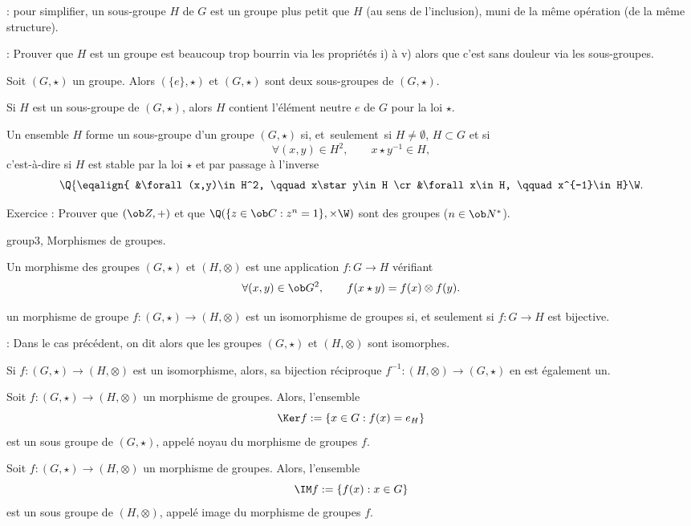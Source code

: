 \Remarque : pour simplifier, un sous-groupe $H$ de $G$ est un groupe plus petit que $H$ (au sens de l'inclusion), muni de la m\^eme op\'eration (de la m\^eme structure). 
\bigskip

\Remarque : Prouver que $H$ est un groupe est beaucoup trop bourrin via les propri\'et\'es i) \`a v) alors que 
c'est sans douleur via les sous-groupes. 
\bigskip

\Propriete []  Soit $(G,\star)$ un groupe. Alors $(\{e\},\star)$ et $(G,\star)$ sont deux sous-groupes de $(G,\star)$. 
\bigskip

\Propriete []  Si $H$ est un sous-groupe de $(G,\star)$, alors $H$ contient l'\'el\'ement neutre $e$ de $G$ pour la loi $\star$. 
\bigskip

\Propriete []  Un ensemble $H$ forme un sous-groupe d'un groupe $(G,\star)$ si, et~seulement~si
$H\neq\emptyset$, $H\subset G$ et si 
$$
{\forall (x,y)\in H^2,\qquad x\star y^{-1}\in H}, 
$$
c'est-\`a-dire si $H$ est stable par la loi $\star$ et par passage \`a l'inverse
$$
\Q\{
\eqalign{
&\forall (x,y)\in H^2, \qquad x\star y\in H
\cr
&\forall x\in H, \qquad x^{-1}\in H}\W.
$$

Exercice :  Prouver que $(\ob Z, +)$ et que $\Q(\{z\in\ob C:z^n=1\},\times\W)$ sont des groupes ($n\in\ob N^*$). 
\bigskip

\Subsection group3, Morphismes de groupes. 

Un morphisme des groupes $(G,\star)$ et $(H,\otimes)$ est une application $f:G\to H$ v\'erifiant 
$$
\forall (x,y)\in\ob G^2 , \qquad  f(x\star y)=f(x)\otimes f(y) .
$$ 

\Definition []  un morphisme de groupe $f:(G,\star)\to(H,\otimes)$ est un isomorphisme de groupes si, 
et seulement si $f:G\to H$ est bijective. 
\bigskip

\Remarque : Dans le cas pr\'ec\'edent, on dit alors que les groupes $(G,\star)$ et $(H,\otimes)$ sont isomorphes. 
\bigskip

\Propriete []  Si $f:(G,\star)\to(H,\otimes)$ est un isomorphisme, alors, sa bijection r\'eciproque $f^{-1}:(H,\otimes)\to(G,\star)$ 
en est \'egalement un. 
\bigskip

\Propriete []  Soit $f:(G,\star)\to (H,\otimes)$ un morphisme de groupes. Alors, l'ensemble 
$$
\Ker f:=\{x\in G:f(x)=e_H\}
$$
est un sous groupe de $(G,\star)$, appel\'e noyau du morphisme de groupes $f$. 
\bigskip

\Propriete []  Soit $f:(G,\star)\to (H,\otimes)$ un morphisme de groupes. Alors, l'ensemble 
$$
\IM f:=\{f(x):x\in G\}
$$
est un sous groupe de $(H,\otimes)$, appel\'e image du morphisme de groupes $f$. 
\bigskip

